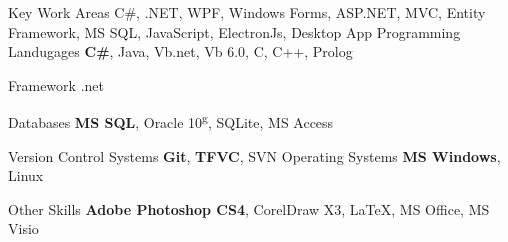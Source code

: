 

\begin{cvskills}
\cvskill
{Key Work Areas} %
{C\#, .NET, WPF, Windows Forms, ASP.NET, MVC, Entity Framework, MS SQL, JavaScript, ElectronJs, Desktop App} %
  \cvskill
    {Programming Landugages} %
    {\textbf{C\#}, Java, Vb.net, Vb 6.0, C, C++, Prolog} %
    
 \cvskill
{Framework} %
{.net} %
  
  \cvskill
    {Databases} %
    {\textbf{MS SQL}, Oracle 10\textsuperscript{g}, SQLite, MS Access} %
    
   \cvskill
 {Version Control Systems} %
 {\textbf{Git}, \textbf{TFVC}, SVN } %
 \cvskill
 {Operating Systems} %
 {\textbf{MS Windows}, Linux} %
 
\cvskill
{Other Skills} %
{\textbf{Adobe Photoshop CS4}, CorelDraw X3, \LaTeX, MS Office, MS Visio} %

\end{cvskills}
